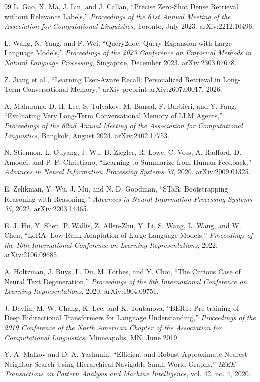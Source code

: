 \documentclass[12pt,letterpaper,oneside]{report}
\begin{document}
\begin{thebibliography}{99}
 L. Gao, X. Ma, J. Lin, and J. Callan, ``Precise
Zero-Shot Dense Retrieval without Relevance Labels,'' \emph{Proceedings of the
61st Annual Meeting of the Association for Computational Linguistics}, Toronto,
July 2023. arXiv:2212.10496.

 L. Wang, N. Yang, and F. Wei, ``Query2doc:
Query Expansion with Large Language Models,'' \emph{Proceedings of the 2023
Conference on Empirical Methods in Natural Language Processing}, Singapore,
December 2023. arXiv:2303.07678.

 Z. Jiang et al., ``Learning User-Aware Recall:
Personalized Retrieval in Long-Term Conversational Memory,'' arXiv preprint
arXiv:2607.00017, 2026.

 A. Maharana, D.-H. Lee, S. Tulyakov,
M. Bansal, F. Barbieri, and Y. Fang, ``Evaluating Very Long-Term Conversational
Memory of LLM Agents,'' \emph{Proceedings of the 62nd Annual Meeting of the
Association for Computational Linguistics}, Bangkok, August 2024.
arXiv:2402.17753.

 N. Stiennon, L. Ouyang, J. Wu, D. Ziegler,
R. Lowe, C. Voss, A. Radford, D. Amodei, and P. F. Christiano, ``Learning to
Summarize from Human Feedback,'' \emph{Advances in Neural Information
Processing Systems 33}, 2020. arXiv:2009.01325.

 E. Zelikman, Y. Wu, J. Mu, and N. D. Goodman,
``STaR: Bootstrapping Reasoning with Reasoning,'' \emph{Advances in Neural
Information Processing Systems 35}, 2022. arXiv:2203.14465.

 E. J. Hu, Y. Shen, P. Wallis, Z. Allen-Zhu,
Y. Li, S. Wang, L. Wang, and W. Chen, ``LoRA: Low-Rank Adaptation of Large
Language Models,'' \emph{Proceedings of the 10th International Conference on
Learning Representations}, 2022. arXiv:2106.09685.

 A. Holtzman, J. Buys, L. Du, M. Forbes, and
Y. Choi, ``The Curious Case of Neural Text Degeneration,'' \emph{Proceedings of
the 8th International Conference on Learning Representations}, 2020.
arXiv:1904.09751.

 J. Devlin, M.-W. Chang, K. Lee, and
K. Toutanova, ``BERT: Pre-training of Deep Bidirectional Transformers for
Language Understanding,'' \emph{Proceedings of the 2019 Conference of the North
American Chapter of the Association for Computational Linguistics},
Minneapolis, MN, June 2019.

 Y. A. Malkov and D. A. Yashunin, ``Efficient and
Robust Approximate Nearest Neighbor Search Using Hierarchical Navigable Small
World Graphs,'' \emph{IEEE Transactions on Pattern Analysis and Machine
Intelligence}, vol. 42, no. 4, 2020.


\end{thebibliography}
\end{document}
